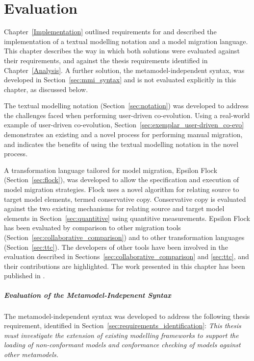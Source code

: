 
\chapter{Evaluation}
\label{Evaluation}
Chapter~\ref{Implementation} outlined requirements for and described the implementation of a textual modelling notation and a model migration language. This chapter describes the way in which both solutions were evaluated against their requirements, and against the thesis requirements identified in Chapter~\ref{Analysis}. A further solution, the metamodel-independent syntax, was developed in Section~\ref{sec:mmi_syntax} and is not evaluated explicitly in this chapter, as discussed below. 

The textual modelling notation (Section~\ref{sec:notation}) was developed to address the challenges faced when performing user-driven co-evolution. Using a real-world example of user-driven co-evolution, Section~\ref{sec:exemplar_user-driven_co-evo} demonstrates an existing and a novel process for performing manual migration, and indicates the benefits of using the textual modelling notation in the novel process. 

A transformation language tailored for model migration, Epsilon Flock (Section~\ref{sec:flock}), was developed to allow the specification and execution of model migration strategies. Flock uses a novel algorithm for relating source to target model elements, termed conservative copy. Conservative copy is evaluated against the two existing mechanisms for relating source and target model elements in Section~\ref{sec:quantitive} using quantitive measurements. Epsilon Flock has been evaluated by comparison to other migration tools (Section~\ref{sec:collaborative_comparison}) and to other transformation languages (Section~\ref{sec:ttc}). The developers of other tools have been involved in the evaluation described in Sections~\ref{sec:collaborative_comparison} and \ref{sec:ttc}, and their contributions are highlighted. The work presented in this chapter has been published in \cite{rose10comparison,rose10ttc_case,rose10ttc_solution}.

\paragraph{Evaluation of the Metamodel-Indepenent Syntax} The metamodel-independent syntax was developed to address the following thesis requirement, identified in Section~\ref{sec:requirements_identification}: \emph{This thesis must investigate the extension of existing modelling frameworks to support the loading of non-conformant models and conformance checking of models against other metamodels.}

